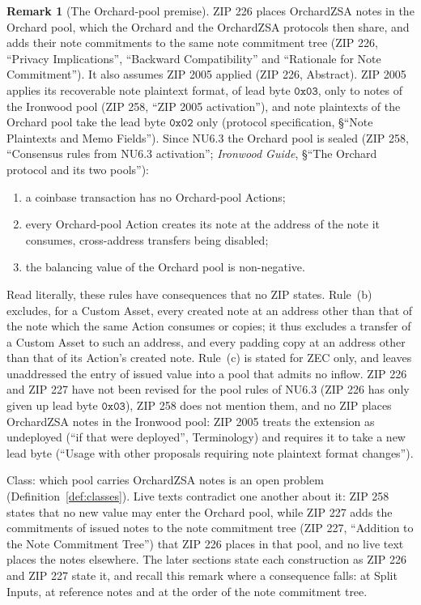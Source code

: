 \documentclass[11pt,a4paper]{article}
\theoremstyle{definition}
\newtheorem{remark}[theorem]{Remark}
\begin{document}
\begin{remark}[The Orchard-pool premise]\label{rem:pool-premise}
ZIP 226 places OrchardZSA notes in the Orchard pool, which the Orchard and
the OrchardZSA protocols then share, and adds their note commitments to the
same note commitment tree (ZIP 226, ``Privacy Implications'', ``Backward
Compatibility'' and ``Rationale for Note Commitment''). It also assumes ZIP
2005 applied (ZIP 226, Abstract). ZIP 2005 applies its recoverable note
plaintext format, of lead byte $\mathtt{0x03}$, only to notes of the
Ironwood pool (ZIP 258, ``ZIP 2005 activation''), and note plaintexts of the
Orchard pool take the lead byte $\mathtt{0x02}$ only (protocol
specification, \S``Note Plaintexts and Memo Fields''). Since NU6.3 the
Orchard pool is sealed (ZIP 258, ``Consensus rules from NU6.3 activation'';
\emph{Ironwood Guide}, \S``The Orchard protocol and its two pools''):
\begin{enumerate}[label=(\alph*)]
\item a coinbase transaction has no Orchard-pool Actions;
\item every Orchard-pool Action creates its note at the address of the note
  it consumes, cross-address transfers being disabled;
\item the balancing value of the Orchard pool is non-negative.
\end{enumerate}
Read literally, these rules have consequences that no ZIP states. Rule~(b)
excludes, for a Custom Asset, every created note at an address other than
that of the note which the same Action consumes or copies; it thus
excludes a transfer of a Custom Asset to such an address, and every padding
copy at an address other than that of its Action's created note. Rule~(c)
is stated for ZEC only, and leaves unaddressed the entry of issued value
into a pool that admits no inflow. ZIP 226 and ZIP 227 have not been
revised for the pool rules of NU6.3 (ZIP 226 has only given up lead byte
$\mathtt{0x03}$), ZIP 258 does not mention them, and no ZIP places
OrchardZSA notes in the Ironwood pool: ZIP 2005 treats the extension as
undeployed (``if that were deployed'', Terminology) and requires it to take
a new lead byte (``Usage with other proposals requiring note plaintext
format changes'').

Class: which pool carries OrchardZSA notes is an open problem
(Definition~\ref{def:classes}). Live texts contradict one another about it:
ZIP 258 states that no new value may enter the Orchard pool, while ZIP 227
adds the commitments of issued notes to the note commitment tree (ZIP 227,
``Addition to the Note Commitment Tree'') that ZIP 226 places in that pool,
and no live text places the notes elsewhere. The later sections state each
construction as ZIP 226 and ZIP 227 state it, and recall this remark where a
consequence falls: at Split Inputs, at reference notes and at the order of
the note commitment tree.
\end{remark}
\end{document}
